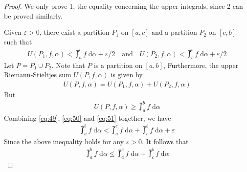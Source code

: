 \documentclass[thmcnt=section, 12pt]{my-elegantbook}
\begin{document}
\begin{proof}
    We only prove 1, the equality concerning the upper integrals, since 2 can be proved similarly. 

    Given $\varepsilon > 0$, there exist a partition $P_1$ on $[a, c]$ and a partition $P_2$ on $[c, b]$ such that 
    \begin{align}
        U(P_1,f,\alpha) < \upint_a^c f \; \mathrm{d}\alpha + \varepsilon/2
        \quad \text{and} \quad
        U(P_2,f,\alpha) < \upint_c^b f \; \mathrm{d}\alpha + \varepsilon/2
        \label{eq:49}
    \end{align}
    Let $P = P_1 \cup P_2$. Note that $P$ is a partition on $[a, b]$, Furthermore, the upper Riemann-Stieltjes sum $U(P,f,\alpha)$ is given by 
    \begin{align}
        U(P,f,\alpha) = U(P_1,f,\alpha) + U(P_2,f,\alpha)
        \label{eq:50}
    \end{align}
    But 
    \begin{align}
        U(P,f,\alpha) \geq \upint_a^b f \; \mathrm{d}\alpha
        \label{eq:51}
    \end{align}
    Combining \eqref{eq:49}, \eqref{eq:50} and \eqref{eq:51} together, we have 
    \begin{align*}
        \upint_a^b f \; \mathrm{d}\alpha
        < \upint_a^c f \; \mathrm{d}\alpha + \upint_c^b f \; \mathrm{d}\alpha + \varepsilon
    \end{align*}
    Since the above inequality holds for any $\varepsilon > 0$. It follows that 
    \begin{align}
        \upint_a^b f \; \mathrm{d}\alpha
        \leq \upint_a^c f \; \mathrm{d}\alpha + \upint_c^b f \; \mathrm{d}\alpha
        \label{eq:52}
    \end{align}


\end{proof}
\end{document}
